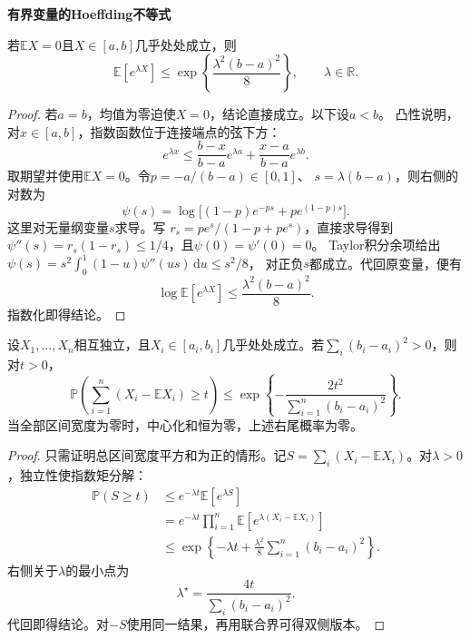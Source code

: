 \par\medskip\noindent\textbf{有界变量的Hoeffding不等式}\quad
\begin{lemma}[Hoeffding引理]
\label{lem:probability-hoeffding-lemma}
若\(\mathbb{E}X=0\)且\(X\in[a,b]\)几乎处处成立，则
\[ \mathbb{E}[e^{\lambda X}]
  \leq\exp\left\{\frac{\lambda^2(b-a)^2}{8}\right\},\qquad \lambda\in\mathbb{R}. \]
\end{lemma}

\begin{proof}
若\(a=b\)，均值为零迫使\(X=0\)，结论直接成立。以下设\(a<b\)。
凸性说明，对\(x\in[a,b]\)，指数函数位于连接端点的弦下方：
\[ e^{\lambda x}
  \leq\frac{b-x}{b-a}e^{\lambda a}+\frac{x-a}{b-a}e^{\lambda b}. \]
取期望并使用\(\mathbb{E}X=0\)。令\(p=-a/(b-a)\in[0,1]\)、
\(s=\lambda(b-a)\)，则右侧的对数为
\[
 \psi(s)=\log\bigl[(1-p)e^{-ps}+pe^{(1-p)s}\bigr].
\]
这里对无量纲变量\(s\)求导。写
\(r_s=pe^s/(1-p+pe^s)\)，直接求导得到
\(\psi''(s)=r_s(1-r_s)\leq1/4\)，且\(\psi(0)=\psi'(0)=0\)。
Taylor积分余项给出
\(\psi(s)=s^2\int_0^1(1-u)\psi''(us)\,\mathrm du\leq s^2/8\)，
对正负\(s\)都成立。代回原变量，便有
\[ \log\mathbb{E}[e^{\lambda X}]
  \leq\frac{\lambda^2(b-a)^2}{8}. \]
指数化即得结论。
\end{proof}

\begin{theorem}[Hoeffding不等式]
\label{thm:probability-hoeffding-inequality}
设\(X_1,\ldots,X_n\)相互独立，且\(X_i\in[a_i,b_i]\)几乎处处成立。若\(\sum_i(b_i-a_i)^2>0\)，则对\(t>0\)，
\[
  \mathbb{P}\left(
    \sum_{i=1}^{n}(X_i-\mathbb{E}X_i)\geq t
  \right)
  \leq
  \exp\left\{
    -\frac{2t^2}{\sum_{i=1}^{n}(b_i-a_i)^2}
  \right\}.
\]
当全部区间宽度为零时，中心化和恒为零，上述右尾概率为零。
\end{theorem}

\begin{proof}
只需证明总区间宽度平方和为正的情形。记\(S=\sum_i(X_i-\mathbb{E}X_i)\)。对\(\lambda>0\)，独立性使指数矩分解：
\[
\begin{aligned}
  \mathbb{P}(S\geq t)
  &\leq
  e^{-\lambda t}\mathbb{E}[e^{\lambda S}]\\
  &=
  e^{-\lambda t}
  \prod_{i=1}^{n}
  \mathbb{E}\left[
    e^{\lambda(X_i-\mathbb{E}X_i)}
  \right]\\
  &\leq
  \exp\left\{
    -\lambda t+
    \frac{\lambda^2}{8}
    \sum_{i=1}^{n}(b_i-a_i)^2
  \right\}.
\end{aligned}
\]
右侧关于\(\lambda\)的最小点为
\[ \lambda^\star
  =\frac{4t}{\sum_i(b_i-a_i)^2}. \]
代回即得结论。对\(-S\)使用同一结果，再用联合界可得双侧版本。
\end{proof}

